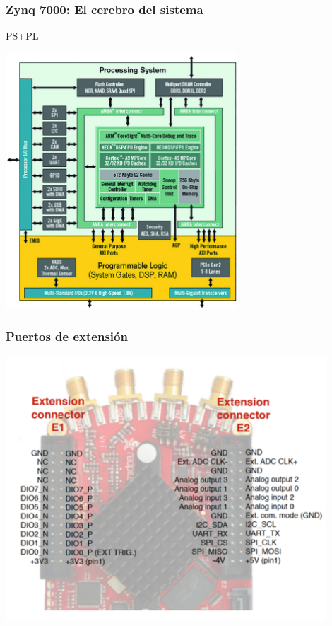\documentclass{beamer}
\begin{document}
\begin{frame}
  \frametitle{Zynq 7000: El cerebro del sistema}
\begin{block}{PS+PL}
  \begin{center}
    \includegraphics[height=0.7\textheight,width=0.65\textwidth]{zynq_como_sistema}
  \end{center}
\end{block}
\end{frame}

\begin{frame}
  \frametitle{Puertos de extensión}
  \begin{center}
    \includegraphics[height=0.8\textheight,width=0.9\textwidth]{rp_extension_connector}
  \end{center}
\end{frame}
\end{document}
